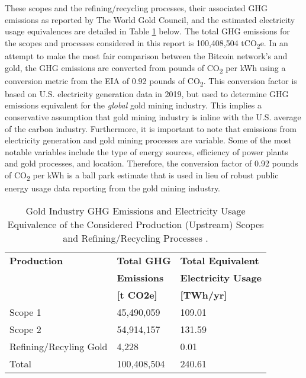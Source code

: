These scopes and the refining/recycling processes, their associated GHG emissions as reported by The World Gold Council, and the estimated electricity usage equivalences are detailed in Table \ref{table:gold-ghg-scopes} below.
The total GHG emissions for the scopes and processes considered in this report is 100,408,504 tCO\textsubscript{2}e.
In an attempt to make the most fair comparison between the Bitcoin network's and gold, the GHG emissions are converted from pounds of CO\textsubscript{2} per kWh using a conversion metric from the EIA of 0.92 pounds of CO\textsubscript{2}. 
This conversion factor is based on U.S. electricity generation data in 2019, but used to determine GHG emissions equivalent for the \textit{global} gold mining industry.
This implies a conservative assumption that gold mining industry is inline with the U.S. average of the carbon industry.
Furthermore, it is important to note that emissions from electricity generation and gold mining processes are variable. 
Some of the most notable variables include the type of energy sources, efficiency of power plants and gold processes, and location.
Therefore, the conversion factor of 0.92 pounds of CO\textsubscript{2} per kWh is a ball park estimate that is used in lieu of robust public energy usage data reporting from the gold mining industry.

\begin{table}[h!]
  \begin{tabularx}{\textwidth}{ X | X | X }
    \multirow{1}{*}{\textbf{Production}}  & \multirow{1}{*}{\textbf{Total GHG }}  & \multirow{1}{*}{\textbf{Total Equivalent}} \\
                                          & \textbf{Emissions}                    & \textbf{Electricity Usage} \\
                                          & \textbf{[t CO2e]}                     & \textbf{[TWh/yr]}\\
    \hline 
    Scope 1                               & 45,490,059                            & 109.01  \\
    Scope 2                               & 54,914,157                            & 131.59  \\
    Refining/Recyling Gold                & 4,228                                 & 0.01    \\
    \hline
    Total                                 &  100,408,504                          & 240.61  \\
  \end{tabularx}
  \caption{Gold Industry GHG Emissions and Electricity Usage Equivalence of the Considered Production (Upstream) Scopes and Refining/Recycling Processes \cite{gold-report}.}
  \label{table:gold-ghg-scopes}
\end{table}

